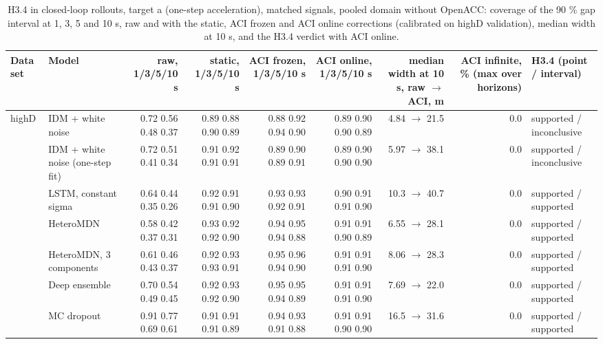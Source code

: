 \begin{table}[htbp]
\centering
\footnotesize
\caption{H3.4 in closed-loop rollouts, target a (one-step acceleration), matched signals, pooled domain without OpenACC: coverage of the 90 \% gap interval at 1, 3, 5 and 10 s, raw and with the static, ACI frozen and ACI online corrections (calibrated on highD validation), median width at 10 s, and the H3.4 verdict with ACI online.}
\label{tab:t4-coverage--lodo-openacc--a}
\begin{tabular}{llrrrrrrl}
\toprule
Data set & Model & raw, 1/3/5/10 s & static, 1/3/5/10 s & ACI frozen, 1/3/5/10 s & ACI online, 1/3/5/10 s & median width at 10 s, raw $\rightarrow$ ACI, m & ACI infinite, \% (max over horizons) & H3.4 (point / interval) \\
\midrule
highD & IDM + white noise & 0.72 0.56 0.48 0.37 & 0.89 0.88 0.90 0.89 & 0.88 0.92 0.94 0.90 & 0.89 0.90 0.90 0.89 & 4.84 $\rightarrow$ 21.5 & 0.0 & supported / inconclusive \\
 & IDM + white noise (one-step fit) & 0.72 0.51 0.41 0.34 & 0.91 0.92 0.91 0.91 & 0.89 0.90 0.89 0.91 & 0.89 0.90 0.90 0.90 & 5.97 $\rightarrow$ 38.1 & 0.0 & supported / inconclusive \\
 & LSTM, constant sigma & 0.64 0.44 0.35 0.26 & 0.92 0.91 0.91 0.90 & 0.93 0.93 0.92 0.91 & 0.90 0.91 0.91 0.90 & 10.3 $\rightarrow$ 40.7 & 0.0 & supported / supported \\
 & HeteroMDN & 0.58 0.42 0.37 0.31 & 0.93 0.92 0.92 0.90 & 0.94 0.95 0.94 0.88 & 0.91 0.91 0.90 0.89 & 6.55 $\rightarrow$ 28.1 & 0.0 & supported / supported \\
 & HeteroMDN, 3 components & 0.61 0.46 0.43 0.37 & 0.92 0.93 0.93 0.91 & 0.95 0.96 0.94 0.90 & 0.91 0.91 0.91 0.90 & 8.06 $\rightarrow$ 28.3 & 0.0 & supported / supported \\
 & Deep ensemble & 0.70 0.54 0.49 0.45 & 0.92 0.93 0.92 0.90 & 0.95 0.95 0.94 0.89 & 0.91 0.91 0.91 0.90 & 7.69 $\rightarrow$ 22.0 & 0.0 & supported / supported \\
 & MC dropout & 0.91 0.77 0.69 0.61 & 0.91 0.91 0.91 0.89 & 0.94 0.93 0.91 0.88 & 0.91 0.91 0.90 0.90 & 16.5 $\rightarrow$ 31.6 & 0.0 & supported / supported \\

\end{tabular}
\end{table}
